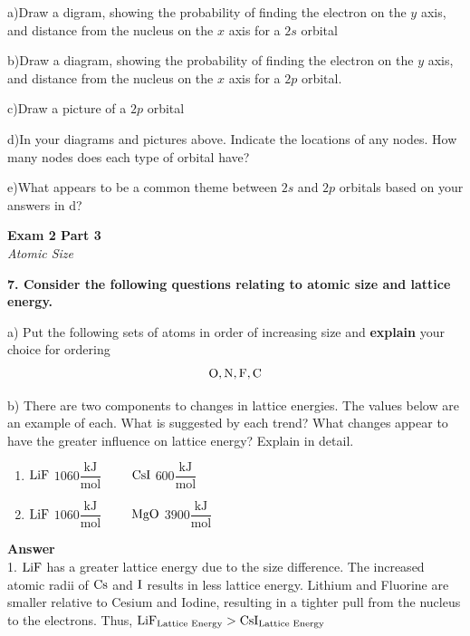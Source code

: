 \documentclass{article}
\begin{document}
    a)Draw a digram, showing the probability of finding the electron on the $y$ axis, and distance from the nucleus on the $x$ axis for a $2s$ orbital

    b)Draw a diagram, showing the probability of finding the electron on the $y$ axis, and distance from the nucleus on the $x$ axis for a $2p$ orbital.

    c)Draw a picture of a $2p$ orbital

    d)In your diagrams and pictures above. Indicate the locations of any nodes. How many nodes does each type of orbital have?

    e)What appears to be a common theme between $2s$ and $2p$ orbitals based on your answers in d?


    \pagebreak

    \begin{center}
        \textbf{Exam 2 Part 3}\\
        \textit{Atomic Size}
    \end{center}
    \textbf{7. Consider the following questions relating to atomic size and lattice energy.}

    a) Put the following sets of atoms in order of increasing size and \textbf{explain} your choice for ordering
    $$\ce{O}, \ce{N}, \ce{F}, \ce{C}$$

    b) There are two components to changes in lattice energies. The values below are an example of each. What is suggested by each trend? What changes appear to have the greater influence on lattice energy? Explain in detail.
    \begin{enumerate}
        \item $\ce{LiF}$ $1060 \dfrac{\si{\kilo\joule}}{\si{\mole}} \qquad$ $\ce{CsI}$  $600 \dfrac{\si{\kilo\joule}}{\si{\mole}}$
        \item  $\ce{LiF}$ $1060 \dfrac{\si{\kilo\joule}}{\si{\mole}} \qquad$ $\ce{MgO}$  $3900 \dfrac{\si{\kilo\joule}}{\si{\mole}}$
    \end{enumerate}
    \textbf{Answer}\\

    1. $\ce{LiF}$ has a greater lattice energy due to the size difference. The increased atomic radii of $\ce{Cs}$ and $\ce{I}$ results in less lattice energy. Lithium and Fluorine are smaller relative to Cesium and Iodine, resulting in a tighter pull from the nucleus to the electrons. Thus, $\ce{LiF}_{\text{Lattice Energy}} > \ce{CsI}_{\text{Lattice Energy}}$
\end{document}
